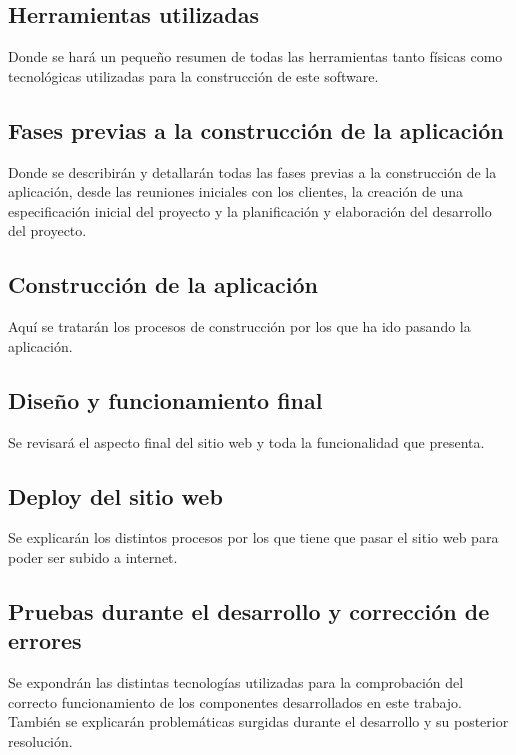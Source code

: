 \subsection{Herramientas utilizadas}

Donde se hará un pequeño resumen de todas las herramientas tanto físicas como tecnológicas utilizadas para la construcción de este software.

\subsection{Fases previas a la construcción de la aplicación}

Donde se describirán y detallarán todas las fases previas a la construcción de la aplicación, desde las reuniones iniciales con los clientes, la creación de una especificación inicial del proyecto y la planificación y elaboración del desarrollo del proyecto.

\subsection{Construcción de la aplicación}

Aquí se tratarán los procesos de construcción por los que ha ido pasando la aplicación.

\subsection{Diseño y funcionamiento final}

Se revisará el aspecto final del sitio web y toda la funcionalidad que presenta.

\subsection{Deploy del sitio web}

Se explicarán los distintos procesos por los que tiene que pasar el sitio web para poder ser subido a internet.

\subsection{Pruebas durante el desarrollo y corrección de errores}

Se expondrán las distintas tecnologías utilizadas para la comprobación del correcto funcionamiento de los componentes desarrollados en este trabajo. También se explicarán problemáticas surgidas durante el desarrollo y su posterior resolución.

